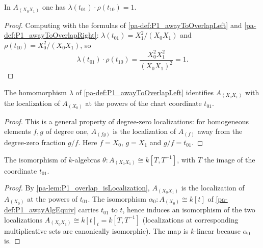 \begin{lemma}
  \label{pa-lem:P1_coord_mul}
  \leanok

  In \(A_{(X_0 X_1)}\) one has \(\lambda(t_{01}) \cdot \rho(t_{10}) = 1\).
\end{lemma}
\begin{proof}
  \leanok
  Computing with the formulas of \ref{pa-def:P1_awayToOverlapLeft} and
  \ref{pa-def:P1_awayToOverlapRight}:
  \(\lambda(t_{01}) = X_1^2 / (X_0 X_1)\) and \(\rho(t_{10}) = X_0^2 / (X_0 X_1)\), so
  \[
    \lambda(t_{01}) \cdot \rho(t_{10})
      = \frac{X_0^2 X_1^2}{(X_0 X_1)^2} = 1 .
  \]
\end{proof}

\begin{lemma}
  \label{pa-lem:P1_overlap_isLocalization}
  \leanok

  The homomorphism \(\lambda\) of \ref{pa-def:P1_awayToOverlapLeft} identifies
  \(A_{(X_0 X_1)}\) with the localization of \(A_{(X_0)}\) at the powers of the chart
  coordinate \(t_{01}\).
\end{lemma}
\begin{proof}
  \leanok
  This is a general property of degree-zero localizations: for homogeneous elements \(f, g\)
  of degree one, \(A_{(fg)}\) is the localization of \(A_{(f)}\) away from the degree-zero
  fraction \(g/f\). Here \(f = X_0\), \(g = X_1\) and \(g/f = t_{01}\).
\end{proof}

\begin{definition}
  \label{pa-def:P1_overlapAlgEquiv}
  \leanok

  The isomorphism of \(k\)-algebras \(\theta : A_{(X_0 X_1)} \cong k[T, T^{-1}]\), with
  \(T\) the image of the coordinate \(t_{01}\).
\end{definition}
\begin{proof}
  \leanok
  By \ref{pa-lem:P1_overlap_isLocalization}, \(A_{(X_0X_1)}\) is the localization of
  \(A_{(X_0)}\) at the powers of \(t_{01}\). The isomorphism
  \(\alpha_0 : A_{(X_0)} \cong k[t]\) of \ref{pa-def:P1_awayAlgEquiv} carries \(t_{01}\) to
  \(t\), hence induces an isomorphism of the two localizations
  \(A_{(X_0X_1)} \cong k[t]_{t} = k[T, T^{-1}]\) (localizations at corresponding
  multiplicative sets are canonically isomorphic). The map is \(k\)-linear because
  \(\alpha_0\) is.
\end{proof}

